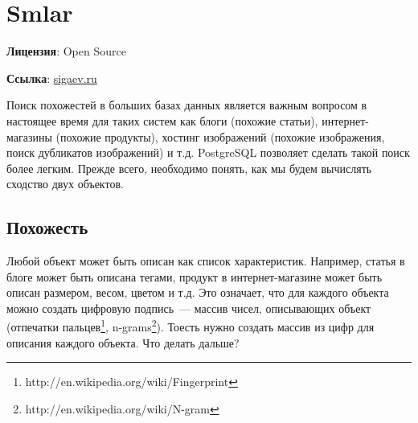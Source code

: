 \section{Smlar}
\textbf{Лицензия}: Open Source

\textbf{Ссылка}: \href{http://sigaev.ru/git/gitweb.cgi?p=smlar.git;a=blob;hb=HEAD;f=README}{sigaev.ru}

Поиск похожестей в больших базах данных является важным вопросом в настоящее время для таких систем как блоги (похожие статьи), интернет-магазины (похожие продукты), хостинг изображений (похожие изображения, поиск дубликатов изображений) и т.д. PostgreSQL позволяет сделать такой поиск более легким. Прежде всего, необходимо понять, как мы будем вычислять сходство двух объектов.

\subsection{Похожесть}

Любой объект может быть описан как список характеристик. Например, статья в блоге может быть описана тегами, продукт в интернет-магазине может быть описан размером, весом, цветом и т.д. Это означает, что для каждого объекта можно создать цифровую подпись~--- массив чисел, описывающих объект (отпечатки пальцев\footnote{http://en.wikipedia.org/wiki/Fingerprint}, n-grams\footnote{http://en.wikipedia.org/wiki/N-gram}). Тоесть нужно создать массив из цифр для описания каждого объекта. Что делать дальше?